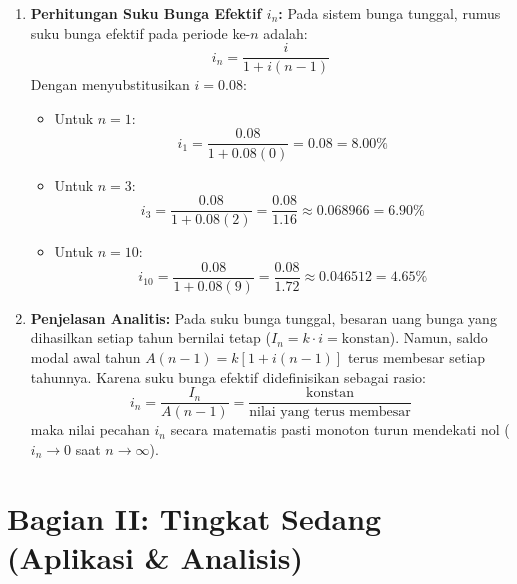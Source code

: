 \documentclass[11pt,a4paper]{article}
\begin{document}
\begin{solutionbox}[Soal 3]
\begin{enumerate}[label=(\alph*)]
    \item \textbf{Perhitungan Suku Bunga Efektif $i_n$:}
    Pada sistem bunga tunggal, rumus suku bunga efektif pada periode ke-$n$ adalah:
    \begin{equation*}
        i_n = \frac{i}{1 + i(n-1)}
    \end{equation*}
    Dengan menyubstitusikan $i = 0.08$:
    \begin{itemize}
        \item Untuk $n = 1$:
        \begin{equation*}
            i_1 = \frac{0.08}{1 + 0.08(0)} = 0.08 = \mathbf{8.00\%}
        \end{equation*}
        \item Untuk $n = 3$:
        \begin{equation*}
            i_3 = \frac{0.08}{1 + 0.08(2)} = \frac{0.08}{1.16} \approx 0.068966 = \mathbf{6.90\%}
        \end{equation*}
        \item Untuk $n = 10$:
        \begin{equation*}
            i_{10} = \frac{0.08}{1 + 0.08(9)} = \frac{0.08}{1.72} \approx 0.046512 = \mathbf{4.65\%}
        \end{equation*}
    \end{itemize}

    \item \textbf{Penjelasan Analitis:}
    Pada suku bunga tunggal, besaran uang bunga yang dihasilkan setiap tahun bernilai tetap ($I_n = k \cdot i = \text{konstan}$). Namun, saldo modal awal tahun $A(n-1) = k[1 + i(n-1)]$ terus membesar setiap tahunnya. Karena suku bunga efektif didefinisikan sebagai rasio:
    \begin{equation*}
        i_n = \frac{I_n}{A(n-1)} = \frac{\text{konstan}}{\text{nilai yang terus membesar}}
    \end{equation*}
    maka nilai pecahan $i_n$ secara matematis pasti monoton turun mendekati nol ($i_n \to 0$ saat $n \to \infty$).
\end{enumerate}
\end{solutionbox}

\newpage
\section*{Bagian II: Tingkat Sedang (Aplikasi \& Analisis)}
\end{document}
